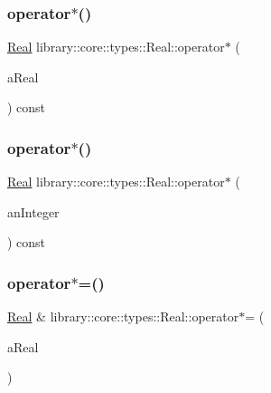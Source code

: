 \subsubsection{\texorpdfstring{operator$\ast$()}{operator*()}\hspace{0.1cm}{\footnotesize\ttfamily [2/3]}}
{\footnotesize\ttfamily \hyperlink{classlibrary_1_1core_1_1types_1_1_real}{Real} library\+::core\+::types\+::\+Real\+::operator$\ast$ (\begin{DoxyParamCaption}\item[{const \hyperlink{classlibrary_1_1core_1_1types_1_1_real_a9c5c8826b7e5a8e39544d23fea6c0e1c}{Real\+::\+Value\+Type} \&}]{a\+Real }\end{DoxyParamCaption}) const}

\mbox{\label{classlibrary_1_1core_1_1types_1_1_real_addb91f5d8c5a22716942f7e5d180073c}} 
\subsubsection{\texorpdfstring{operator$\ast$()}{operator*()}\hspace{0.1cm}{\footnotesize\ttfamily [3/3]}}
{\footnotesize\ttfamily \hyperlink{classlibrary_1_1core_1_1types_1_1_real}{Real} library\+::core\+::types\+::\+Real\+::operator$\ast$ (\begin{DoxyParamCaption}\item[{const \hyperlink{classlibrary_1_1core_1_1types_1_1_integer}{Integer} \&}]{an\+Integer }\end{DoxyParamCaption}) const}

\mbox{\label{classlibrary_1_1core_1_1types_1_1_real_a7ce9bdd2c145c3684498cac094dc240e}} 
\subsubsection{\texorpdfstring{operator$\ast$=()}{operator*=()}\hspace{0.1cm}{\footnotesize\ttfamily [1/2]}}
{\footnotesize\ttfamily \hyperlink{classlibrary_1_1core_1_1types_1_1_real}{Real} \& library\+::core\+::types\+::\+Real\+::operator$\ast$= (\begin{DoxyParamCaption}\item[{const \hyperlink{classlibrary_1_1core_1_1types_1_1_real}{Real} \&}]{a\+Real }\end{DoxyParamCaption})}

